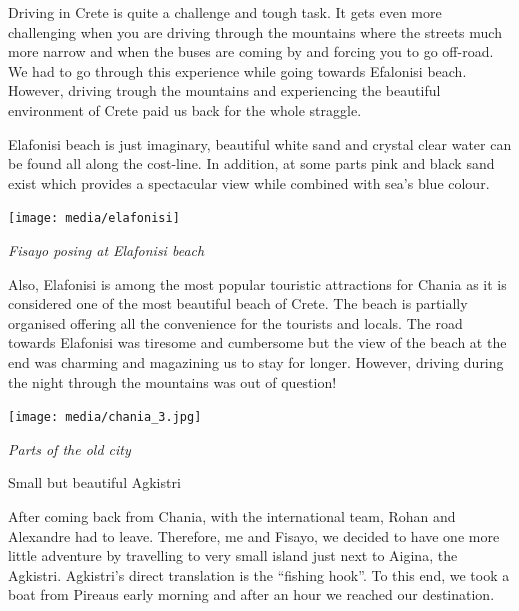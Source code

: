 \documentclass[10pt,a4paper]{article} %
\newcommand{\NewsItem}[1]{ %
\usefont{T1}{fvs}{n}{n} %
\vspace{24pt}\large #1\vspace{3pt} %
\par \normalsize \normalfont}
\begin{document}
\begin{multicols}{3}
Driving in Crete is quite a challenge and tough task. 
It gets even more challenging when you are driving through the mountains 
where the streets much more narrow and when the buses are coming by and 
forcing you to go off-road. 
We had to go through this experience while going towards Efalonisi beach. 
However, driving trough the mountains and experiencing the beautiful environment 
of Crete paid us back for the whole straggle.



Elafonisi beach is just imaginary, beautiful white sand and crystal clear water 
can be found all along the cost-line. 
In addition, at some parts pink and black sand exist which provides a spectacular 
view while combined with sea's blue colour.


\begin{center}
	\texttt{[image: media/elafonisi]}
	\par\textit{Fisayo posing at Elafonisi beach}
\end{center}


Also, Elafonisi is among the most popular touristic attractions for Chania as it is considered 
one of the most beautiful beach of Crete. 
The beach is partially organised offering all the convenience for the tourists and 
locals. 
The road towards Elafonisi was tiresome and cumbersome but the view of the beach 
at the end was charming and magazining us to stay for longer. 
However, driving during the night through the mountains was out of question!

\begin{center}
	\texttt{[image: media/chania\_3.jpg]}
	\par\textit{Parts of the old city}
\end{center}



\NewsItem{Small but beautiful Agkistri}

After coming back from Chania, with the international team, Rohan and Alexandre 
had to leave. 
Therefore, me and Fisayo, we decided to have one more little adventure by travelling 
to very small island just next to Aigina, the Agkistri. 
Agkistri's direct translation is the ``fishing hook''. 
To this end, we took a boat from Pireaus early morning and after an hour we 
reached our destination.



\end{multicols}
\end{document}
